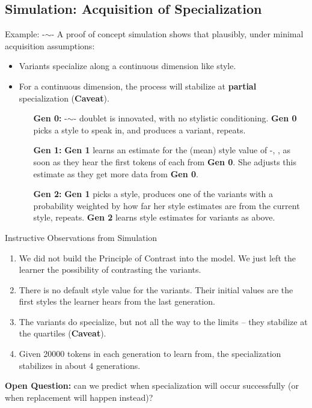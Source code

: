 \documentclass[hyperref={pdfpagelabels=false}]{beamer}
\begin{document}
\subsection{Simulation: Acquisition of Specialization}
\begin{frame}{Example: -$\sim$-}
	A proof of concept simulation shows that plausibly, under minimal acquisition assumptions:
	\begin{itemize}
	\item Variants specialize along a continuous dimension like style.
	\item For a continuous dimension, the process will stabilize at \textbf{partial} specialization (\textbf{Caveat}). 
	\item[ ] \begin{itemize}
		\item[\textbf{Gen 0:}]  -$\sim$- doublet is innovated, with no stylistic conditioning. \textbf{Gen 0} picks a style to speak in, and produces a variant, repeats. 
		\item[\textbf{Gen 1:}]  \textbf{Gen 1} learns an estimate for the (mean) style value of -, , as soon as they hear the first tokens of each from \textbf{Gen 0}. She adjusts this estimate as they get more data from \textbf{Gen 0}.
		\item[\textbf{Gen 2:}] \textbf{Gen 1} picks a style, produces one of the variants with a probability weighted by how far her style estimates are from the current style, repeats. \textbf{Gen 2} learns style estimates for variants as above.
	\end{itemize}
	\end{itemize}
\end{frame}


%

\begin{frame}{Instructive Observations from Simulation}
\begin{enumerate}
	\item We did not build the Principle of Contrast into the model. We just left the learner the possibility of contrasting the variants.
	\item There is no default style value for the variants. Their initial values are the first styles the learner hears from the last generation.
	\item The variants do specialize, but not all the way to the limits -- they stabilize at the quartiles (\textbf{Caveat}).
	\item Given 20000 tokens in each generation to learn from, the specialization stabilizes in about 4 generations.%
\end{enumerate}
	\textbf{Open Question:} can we predict when specialization will occur successfully (or when replacement will happen instead)?
\end{frame}
\end{document}

